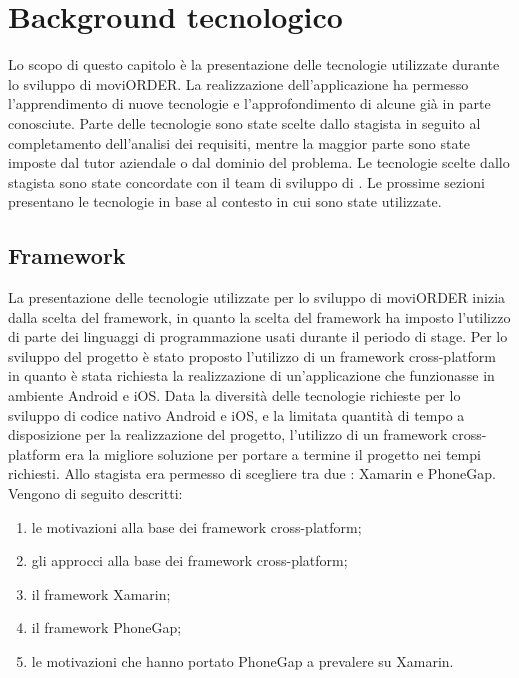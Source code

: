
\chapter{Background tecnologico} \label{background}

Lo scopo di questo capitolo è la presentazione delle tecnologie utilizzate durante lo sviluppo di moviORDER. La realizzazione dell'applicazione ha permesso l'apprendimento di nuove tecnologie e l'approfondimento di alcune già in parte conosciute. Parte delle tecnologie sono state scelte dallo stagista in seguito al completamento dell'analisi dei requisiti, mentre la maggior parte sono state imposte dal tutor aziendale o dal dominio del problema. Le tecnologie scelte dallo stagista sono state concordate con il team di sviluppo di \visione{}. Le prossime sezioni presentano le tecnologie in base al contesto in cui sono state utilizzate.

\section{Framework}	

La presentazione delle tecnologie utilizzate per lo sviluppo di moviORDER inizia dalla scelta del framework, in quanto la scelta del framework ha imposto l'utilizzo di parte dei linguaggi di programmazione usati durante il periodo di stage. Per lo sviluppo del progetto è stato proposto l'utilizzo di un framework cross-platform in quanto è stata richiesta la realizzazione di un'applicazione che funzionasse in ambiente Android e iOS. Data la diversità delle tecnologie richieste per lo sviluppo di codice nativo Android e iOS, e la limitata quantità di tempo a disposizione per la realizzazione del progetto, l'utilizzo di un framework cross-platform era la migliore soluzione per portare a termine il progetto nei tempi richiesti. Allo stagista era permesso di scegliere tra due : Xamarin e PhoneGap.\\ Vengono di seguito descritti:
\begin{enumerate}
	\item le motivazioni alla base dei framework cross-platform;
	\item gli approcci alla base dei framework cross-platform;
	\item il framework Xamarin;
	\item il framework PhoneGap;
	\item le motivazioni che hanno portato PhoneGap a prevalere su Xamarin.
\end{enumerate}

